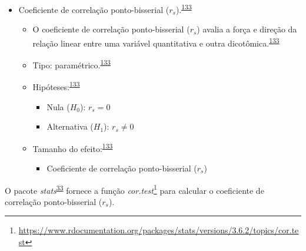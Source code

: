 \documentclass[
  a4paper,
]{book}
\providecommand{\tightlist}{%
  \setlength{\itemsep}{0pt}\setlength{\parskip}{0pt}}
\renewcommand{\href}[2]{#2\footnote{\url{#1}}}
\newenvironment{infobox}[1]
  {
  \begin{itemize}
  \renewcommand{\labelitemi}{
    \raisebox{-.7\height}[0pt][0pt]{
      {\setkeys{Gin}{width=3em,keepaspectratio}
        \texttt{[image: \#1]}}
    }
  }
  \setlength{\fboxsep}{1em}
  \begin{blackbox}
  \item
  }
  {
  \end{blackbox}
  \end{itemize}
  }
\begin{document}
\begin{itemize}
\item
  Coeficiente de correlação ponto-bisserial (\(r_{s}\)).\textsuperscript{\protect\hyperlink{ref-khamis2008}{133}}

  \begin{itemize}
  \item
    O coeficiente de correlação ponto-bisserial (\(r_{s}\)) avalia a força e direção da relação linear entre uma variável quantitativa e outra dicotômica.\textsuperscript{\protect\hyperlink{ref-khamis2008}{133}}
  \item
    Tipo: paramétrico.\textsuperscript{\protect\hyperlink{ref-khamis2008}{133}}
  \item
    Hipóteses:\textsuperscript{\protect\hyperlink{ref-khamis2008}{133}}

    \begin{itemize}
    \item
      Nula (\(H_{0}\)): \(r_{s}=0\)
    \item
      Alternativa (\(H_{1}\)): \(r_{s}≠0\)
    \end{itemize}
  \item
    Tamanho do efeito:\textsuperscript{\protect\hyperlink{ref-khamis2008}{133}}

    \begin{itemize}
    \tightlist
    \item
      Coeficiente de correlação ponto-bisserial (\(r_{s}\))
    \end{itemize}
  \end{itemize}
\end{itemize}

\begin{infobox}{images/Rlogo}
O pacote \emph{stats}\textsuperscript{\protect\hyperlink{ref-stats-2}{33}} fornece a função \href{https://www.rdocumentation.org/packages/stats/versions/3.6.2/topics/cor.test}{\emph{cor.test}} para calcular o coeficiente de correlação ponto-bisserial (\(r_{s}\)).

\end{infobox}
\end{document}

